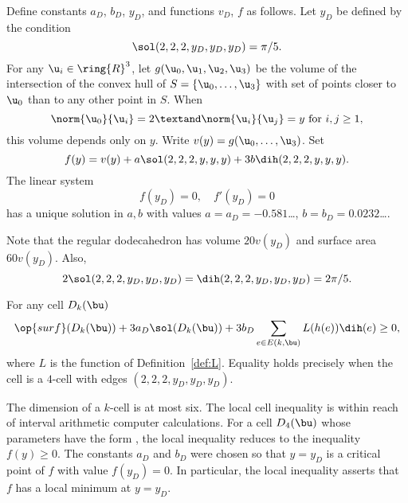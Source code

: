 \begin{definition}[$a_D$,~$b_D$,~$y_D$,~$v_D$,~$f$]
  Define constants $a_D$, $b_D$, $y_D$, and functions $v_D$, $f$ as
  follows.  Let $y_D$ be defined by the condition
\[
\sol(2,2,2,y_D,y_D,y_D) = \pi/5.
\]
For any $\u_i\in\ring{R}^3$, let $g(\u_0,\u_1,\u_2,\u_3)$ be the
volume of the intersection of the convex hull of
$S=\{\u_0,\ldots,\u_3\}$ with set of points closer to $ \u_0$ than to
any other point in $S$.  When
\begin{equation}\label{eqn:uy}
  \norm{\u_0}{\u_i}=2\textand \norm{ \u_i}{ \u_j} = y\text{ for }i,j\ge 1,
\end{equation} 
this volume depends only on $y$. Write $v(y) = g(\u_0,\ldots,\u_3)$.
Set
\[
  f(y) = v(y) + a \sol(2,2,2,y,y,y) + 3 b \dih(2,2,2,y,y,y).
\]
The linear system
\begin{equation}\label{eqn:fyD}
f(y_D) = 0,\quad f'(y_D) = 0
\end{equation}
has a unique solution in $a,b$ with values $a=a_D=-0.581$\dots,
$b=b_D=0.0232$\dots.
\end{definition}
%
%
%
%
%
%

Note that the regular dodecahedron has volume $20 v(y_D)$ and surface
area $60 v(y_D)$.  Also,
\begin{equation}
  2\sol(2,2,2,y_D,y_D,y_D) =\dih(2,2,2,y_D,y_D,y_D)=2\pi/5.
\end{equation}
%
%

\begin{lemma}\label{lemma:D-local}
For any cell $D_k(\bu)$
\[
  \op{surf}(D_k(\bu)) + 3 a_D \sol(D_k(\bu)) 
+ 3 b_D \sum_{e\in E(k,\bu)} L(h(e)) \dih(e) \ge 0,
\]
where $L$ is the function of Definition~\ref{def:L}.  Equality holds
precisely when the cell is a $4$-cell with edges
$(2,2,2,y_D,y_D,y_D)$.
\end{lemma}
%

\begin{remark}
  The dimension of a $k$-cell is at most six.  The local cell
  inequality is within reach of interval arithmetic computer
  calculations.  For a cell $D_4(\bu)$ whose parameters have the form
  , the local inequality reduces to the inequality
  $f(y)\ge 0$.  The constants $a_D$ and $b_D$ were chosen so that
  $y=y_D$ is a critical point of $f$ with value $f(y_D)=0$.  In
  particular, the local inequality asserts that $f$ has a local
  minimum at $y=y_D$.
\end{remark}

